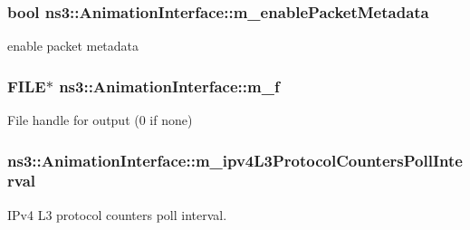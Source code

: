 \subsubsection[{\texorpdfstring{m\+\_\+enable\+Packet\+Metadata}{m_enablePacketMetadata}}]{\setlength{\rightskip}{0pt plus 5cm}bool ns3\+::\+Animation\+Interface\+::m\+\_\+enable\+Packet\+Metadata\hspace{0.3cm}{\ttfamily [private]}}\hypertarget{classns3_1_1AnimationInterface_a5dce9d3fd3d987ef97f68528c0bbf1d0}{}\label{classns3_1_1AnimationInterface_a5dce9d3fd3d987ef97f68528c0bbf1d0}


enable packet metadata 

\subsubsection[{\texorpdfstring{m\+\_\+f}{m_f}}]{\setlength{\rightskip}{0pt plus 5cm}F\+I\+LE$\ast$ ns3\+::\+Animation\+Interface\+::m\+\_\+f\hspace{0.3cm}{\ttfamily [private]}}\hypertarget{classns3_1_1AnimationInterface_a0185faff439edec3095ab22d1ada8aa5}{}\label{classns3_1_1AnimationInterface_a0185faff439edec3095ab22d1ada8aa5}


File handle for output (0 if none) 

\subsubsection[{\texorpdfstring{m\+\_\+ipv4\+L3\+Protocol\+Counters\+Poll\+Interval}{m_ipv4L3ProtocolCountersPollInterval}}]{ ns3\+::\+Animation\+Interface\+::m\+\_\+ipv4\+L3\+Protocol\+Counters\+Poll\+Interval\hspace{0.3cm}{\ttfamily [private]}}\hypertarget{classns3_1_1AnimationInterface_a7a53cc3f3e1835d7426ed14f3c5c66c5}{}\label{classns3_1_1AnimationInterface_a7a53cc3f3e1835d7426ed14f3c5c66c5}


I\+Pv4 L3 protocol counters poll interval. 

